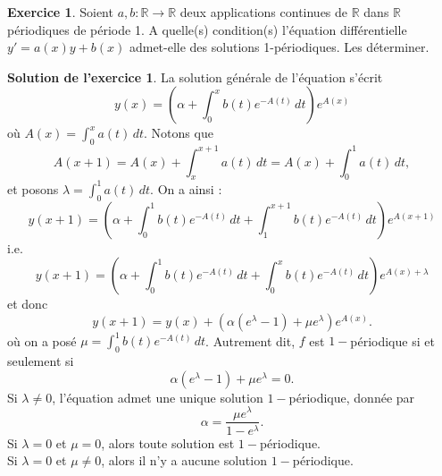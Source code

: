 \documentclass[a4paper, 11pt,openany]{article}%
\theoremstyle{plain}
\theoremstyle{definition}
\newtheorem{exo}{Exercice}
\newtheorem{sol}{Solution de l'exercice}
\theoremstyle{remark}
\newcommand{\R}{\mathbb{R}}
\begin{document}
\begin{exo}
Soient $a,b:\R \to \R$ deux applications continues de $\R$ dans $\R$ périodiques de période 1. A quelle(s) condition(s) l'équation différentielle $y'=a(x)y+b(x)$ admet-elle des solutions 1-périodiques. Les déterminer.
\end{exo}


\begin{sol}
La solution générale de l'équation s'écrit \[y(x)= \left(\alpha + \int_0^x b(t) e^{-A(t)} \,dt \right)e^{A(x)}\]
où $A(x)= \int_0^x a(t) \, dt$.
Notons que 
\[ A(x+1)=A(x)+ \int_x^{x+1} a(t) \,dt = A(x)+ \int_0^1 a(t) \, dt,\]
et posons $\lambda = \int_0^1 a(t) \, dt$. On a ainsi :
\[y(x+1)= \left(\alpha + \int_0^1 b(t) e^{-A(t)} \,dt  + \int_1^{x+1} b(t) e^{-A(t)} \,dt \right)e^{A(x+1)}\]
i.e.
\[ y(x+1) = \left(\alpha + \int_0^1 b(t) e^{-A(t)} \,dt  + \int_0^{x} b(t) e^{-A(t)} \,dt \right)e^{A(x) + \lambda}\]
et donc
\[ y(x+1) = y(x) + (\alpha(e^{\lambda}-1) + \mu e^{\lambda})e^{A(x)}.\]
où on a posé $ \mu = \int_0^1 b(t) e^{-A(t)} \, dt$. Autrement dit, $f$ est $1-$périodique si et seulement si 
\[ \alpha(e^{\lambda} - 1) + \mu e^{\lambda} = 0.\]
Si $\lambda \neq 0$, l'équation admet une unique solution $1-$périodique, donnée par \[  \alpha = \frac{\mu e^{\lambda}}{1 - e^{\lambda}}.\]
Si $\lambda=0$ et $\mu=0$, alors toute solution est $1-$périodique.\\
Si $\lambda = 0$ et $\mu \neq 0$, alors il n'y a aucune solution $1-$périodique.
\end{sol}
\end{document}
